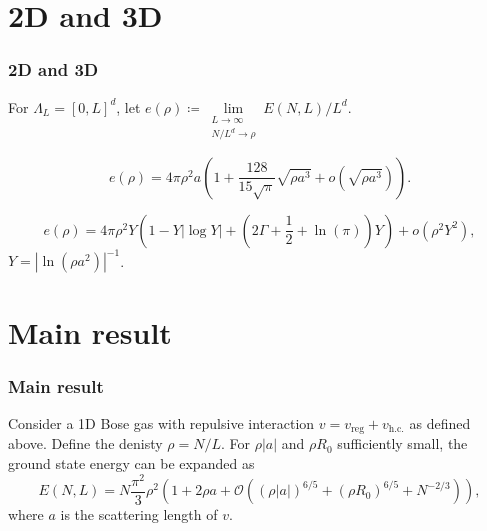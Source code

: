 \documentclass{beamer}[10]
\newcommand{\abs}[1]{\left\lvert #1 \right\rvert}
\begin{document}
\section{2D and 3D}
\begin{frame}
\frametitle{2D and 3D}
\small For $ \Lambda_L=[0,L]^d $, let $ e(\rho)\coloneqq\lim\limits_{\substack{L\to\infty\\ N/L^{d}\to\rho}}E(N,L)/L^{d} $.
\vspace*{-0.3cm}
\begin{block}{}
	\small
	\vspace*{-0.2cm}
	\begin{theorem}[\small $ d=3 $ result, Lee-Huang-Yang 1957\footnotemark]
		\begin{equation}
		e(\rho)=4\pi\rho^2 a\left(1+\frac{128}{15\sqrt{\pi}}\sqrt{\rho a^3}+o(\sqrt{\rho a^3})\right).
		\end{equation}
	\end{theorem}
\vspace*{-0.3cm}
	\begin{theorem}[\small $ d=2 $ result\footnotemark]
		\begin{equation}
		e(\rho)=4 \pi \rho^2 Y\left(1-Y|\log Y|+\left(2 \Gamma+\frac{1}{2}+\ln (\pi)\right) Y\right)+o\left(\rho^2 Y^2\right),
		\end{equation}
		$Y=\abs{\ln(\rho a^2)}^{-1}$.
	\end{theorem}
\end{block}
\end{frame}

\section{Main result}

\begin{frame}
	\frametitle{Main result}
	\begin{block}{}
		\begin{theorem}
			\label{TheoremMain}
			Consider a 1D Bose gas with repulsive interaction  $v=v_{\text{reg}}+v_{\text{h.c.}}$ as defined above. Define the denisty $\rho=N/L$. For $\rho|a|$ and $\rho R_0$ sufficiently small, the ground state energy can be expanded as 
			\begin{equation}
			\label{result}
			E(N,L)=N\frac{\pi^2}{3}\rho^2\left(1+2\rho a+
			\mathcal{O}
			\left((\rho|a|)^{6/5}+(\rho R_0)^{6/5}+N^{-2/3}\right)\right),
			\end{equation}
			where $a$ is the scattering length of $v$.
		\end{theorem}
	\end{block}	
\end{frame}
\end{document}
